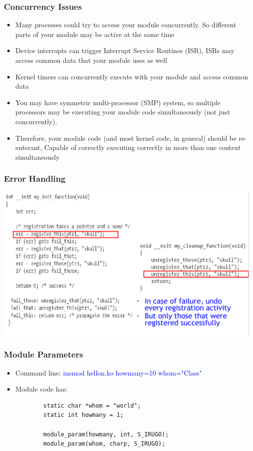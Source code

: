 \documentclass[12pt]{article}
\begin{document}
\subsubsection{Concurrency Issues}
\begin{itemize}
    \item Many processes could try to access your module concurrently. So different parts of your module may be active at the same time
    \item Device interrupts can trigger Interrupt Service Routines (ISR), ISRs may access common data that your module uses as well
    \item Kernel timers can concurrently execute with your module and access common data
    \item You may have symmetric multi-processor (SMP) system, so multiple processors may be executing your module code simultaneously (not just concurrently).
    \item Therefore, your module code (and most kernel code, in general) should be re-enterant, Capable of correctly executing correctly in more than one context simultaneously
\end{itemize}
\subsubsection{Error Handling}
\includegraphics[width=\textwidth]{KernelErrorHandling.png}
\subsubsection{Module Parameters}
\begin{itemize}
    \item Command line: \textcolor{blue}{insmod hellon.ko howmany=10 whom="Class"}
    \item Module code has: \begin{lstlisting}
        static char *whom = "world";
        static int howmany = 1;

        module_param(howmany, int, S_IRUGO);
        module_param(whom, charp, S_IRUGO);
    \end{lstlisting}
\end{itemize}
\end{document}

